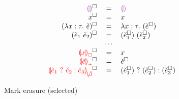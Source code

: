 \newcommand{\erasesToRow}[2]{\erase{#1} & = & #2}
\begin{figure}[htbp]
  \[\begin{array}{rcl}
    \erasesToRow{\ECEHole}{\EEHole} \\
    \erasesToRow{x}{x} \\
    \erasesToRow{(\ECLam{x}{\TMV}{\ECMV})}{\ELam{x}{\TMV}{(\erase{\ECMV})}} \\
    \erasesToRow{(\ECAp{\ECMV_1}{\ECMV_2})}{\EAp{(\erase{\ECMV_1})}{(\erase{\ECMV_2})}} \\
    & \cdots & \\
    \erasesToRow{\ECFree{x}}{x} \\
    \erasesToRow{\ECInconType{\ECMV}}{\erase{\ECMV}} \\
    \erasesToRow{\ECInconBr{\ECMV_1}{\ECMV_2}{\ECMV_3}}{\EIf{(\erase{\ECMV_1})}{(\erase{\ECMV_2})}{(\erase{\ECMV_3})}} \\
  \end{array}\]
  \caption{Mark erasure (selected)}
  \label{fig:calculus-mark-erasure}
\end{figure}

